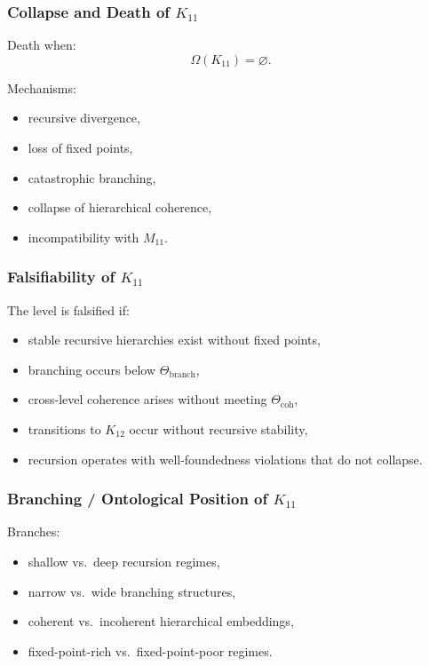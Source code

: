 \subsubsection{Collapse and Death of $K_{11}$}

Death when:
\[
\Omega(K_{11})=\varnothing.
\]

Mechanisms:
\begin{itemize}
    \item recursive divergence,
    \item loss of fixed points,
    \item catastrophic branching,
    \item collapse of hierarchical coherence,
    \item incompatibility with $M_{11}$.
\end{itemize}

\subsubsection{Falsifiability of $K_{11}$}

The level is falsified if:
\begin{itemize}
    \item stable recursive hierarchies exist without fixed points,
    \item branching occurs below $\Theta_{\mathrm{branch}}$,
    \item cross-level coherence arises without meeting $\Theta_{\mathrm{coh}}$,
    \item transitions to $K_{12}$ occur without recursive stability,
    \item recursion operates with well-foundedness violations that do not collapse.
\end{itemize}

\subsubsection{Branching / Ontological Position of $K_{11}$}

Branches:
\begin{itemize}
    \item shallow vs.\ deep recursion regimes,
    \item narrow vs.\ wide branching structures,
    \item coherent vs.\ incoherent hierarchical embeddings,
    \item fixed-point-rich vs.\ fixed-point-poor regimes.
\end{itemize}

